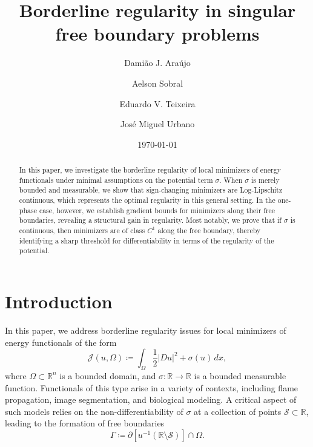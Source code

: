 \documentclass[reqno,11pt]{amsart}
\title[Borderline regularity in singular FBP]{Borderline regularity in singular\\ free boundary problems}
\author[D.J. Araújo]{Dami\~ao J. Ara\'ujo}
\author[A. Sobral]{Aelson Sobral}
\author[E. V. Teixeira]{Eduardo V. Teixeira}
\author[J.M. Urbano]{Jos\'{e} Miguel Urbano}
\newcommand{\1}{\mathds{1}}  %
\numberwithin{equation}{section}
\begin{document}





\begin{abstract}
In this paper, we investigate the borderline regularity of local minimizers of energy functionals under minimal assumptions on the potential term $\sigma$. When $\sigma$ is merely bounded and measurable, we show that sign-changing minimizers are Log-Lipschitz continuous, which represents the optimal regularity in this general setting. In the one-phase case, however, we establish gradient bounds for minimizers along their free boundaries, revealing a structural gain in regularity. Most notably, we prove that if $\sigma$ is continuous, then minimizers are of class $C^1$ along the free boundary, thereby identifying a sharp threshold for differentiability in terms of the regularity of the potential.
\end{abstract}

\date{\today}

\maketitle

\section{Introduction} \label{sct intro}

In this paper, we address borderline regularity issues for local minimizers of energy functionals of the form
\begin{equation}\label{main functional}
\mathcal{J}(u,\Omega) \coloneqq \int_{\Omega} \frac{1}{2}|Du|^2 + \sigma(u)\,dx,
\end{equation}
where $\Omega \subset \mathbb{R}^n$ is a bounded domain, and $\sigma \colon \mathbb{R} \to \mathbb{R}$ is a  bounded measurable function. Functionals of this type arise in a variety of contexts, including flame propagation, image segmentation, and biological modeling. A critical aspect of such models relies on the non-differentiability of $\sigma$ at a collection of points $\mathscr{S} \subset \mathbb{R}$, leading to the formation of free boundaries
$$\Gamma \coloneqq \partial \left [u^{-1}(\mathbb{R} \setminus \mathscr{S}) \right ] \cap \Omega.$$ 
\end{document}
